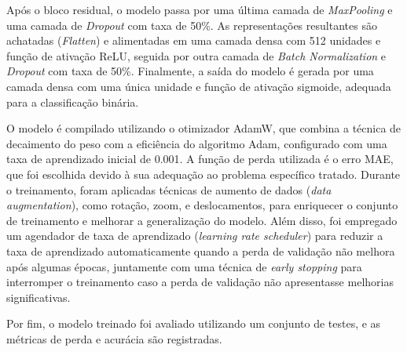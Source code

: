 Após o bloco residual, o modelo passa por uma última camada de \textit{MaxPooling} e uma camada de \textit{Dropout} com taxa de 50\%. As representações resultantes são achatadas (\textit{Flatten}) e alimentadas em uma camada densa com 512 unidades e função de ativação ReLU, seguida por outra camada de \textit{Batch Normalization} e \textit{Dropout} com taxa de 50\%. Finalmente, a saída do modelo é gerada por uma camada densa com uma única unidade e função de ativação sigmoide, adequada para a classificação binária.

O modelo é compilado utilizando o otimizador AdamW, que combina a técnica de decaimento do peso com a eficiência do algoritmo Adam, configurado com uma taxa de aprendizado inicial de 0.001. A função de perda utilizada é o erro MAE, que foi escolhida devido à sua adequação ao problema específico tratado. Durante o treinamento, foram aplicadas técnicas de aumento de dados (\textit{data augmentation}), como rotação, zoom, e deslocamentos, para enriquecer o conjunto de treinamento e melhorar a generalização do modelo. Além disso, foi empregado um agendador de taxa de aprendizado (\textit{learning rate scheduler}) para reduzir a taxa de aprendizado automaticamente quando a perda de validação não melhora após algumas épocas, juntamente com uma técnica de \textit{early stopping} para interromper o treinamento caso a perda de validação não apresentasse melhorias significativas.

Por fim, o modelo treinado foi avaliado utilizando um conjunto de testes, e as métricas de perda e acurácia são registradas.
